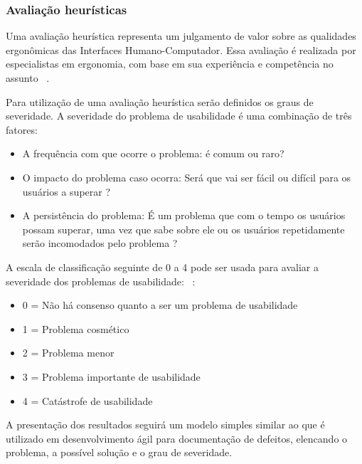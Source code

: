 \subsubsection{Avaliação heurísticas}
\label{avaliacao-heuristica}
Uma avaliação heurística representa um julgamento de valor sobre as qualidades
ergonômicas das Interfaces Humano-Computador. Essa avaliação é realizada por
especialistas em ergonomia, com base em sua experiência e competência no
assunto ~\cite{cybis2010}.

%
Para utilização de uma avaliação heurística serão definidos os graus de
severidade. A severidade do problema de usabilidade é uma combinação de três fatores:
\begin{itemize}
\item A frequência com que ocorre o problema: é comum ou raro?
\item O impacto do problema caso ocorra: Será que vai ser fácil ou difícil para os usuários a superar ?
\item A persistência do problema: É um problema que com o tempo os usuários possam superar, uma vez que sabe sobre ele ou os usuários repetidamente serão incomodados pelo problema ?
\end{itemize}

A escala de classificação seguinte de 0 a 4 pode ser usada para avaliar a severidade dos problemas de usabilidade: ~\cite{nielsen1995severity}:

\begin{itemize}

    \item 0 = Não há consenso quanto a ser um problema de usabilidade

    \item 1 = Problema cosmético

    \item 2 = Problema menor
	
    \item 3 = Problema importante de usabilidade

    \item 4 = Catástrofe de usabilidade

\end{itemize}

A presentação dos resultados seguirá um modelo simples similar ao que é
utilizado em desenvolvimento ágil para documentação de defeitos, elencando o
problema, a possível solução e o grau de severidade.

